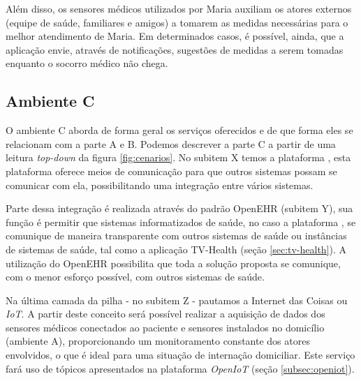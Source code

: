 Além disso, os sensores médicos utilizados por Maria auxiliam os atores
externos (equipe de saúde, familiares e amigos) a tomarem as medidas
necessárias para o melhor atendimento de Maria.  Em determinados casos, é
possível, ainda, que a aplicação envie, através de notificações, sugestões de
medidas a serem tomadas enquanto o socorro médico não chega.

\subsection{Ambiente C} \label{subsec:ambiente-c}

O ambiente C aborda de forma geral os serviços oferecidos e de que forma eles se
relacionam com a parte A e B. Podemos descrever a parte C a partir de uma leitura 
\textit{top-down} da figura \ref{fig:cenarios}. No subitem X temos a plataforma
\nextsaude[], esta plataforma oferece meios de comunicação para que outros sistemas
possam se comunicar com ela, possibilitando uma integração entre vários sistemas.

Parte dessa integração é realizada através do padrão OpenEHR (subitem Y), sua 
função é permitir que sistemas informatizados de saúde, no caso a plataforma
\nextsaude[], se comunique de maneira transparente com outros sistemas de saúde ou
instâncias de sistemas de saúde, tal como a aplicação TV-Health (seção
\vref{sec:tv-health}). A utilização do OpenEHR possibilita que toda a solução
proposta se comunique, com o menor esforço possível, com outros sistemas de 
saúde.

Na última camada da pilha - no subitem Z - pautamos a Internet das Coisas ou
\textit{IoT}. A partir deste conceito será possível realizar a aquisição de
dados dos sensores médicos conectados ao paciente e sensores instalados no domicílio
(ambiente A), proporcionando um monitoramento constante dos atores envolvidos, 
o que é ideal para uma situação de internação domiciliar. Este serviço fará uso 
de tópicos apresentados na plataforma \textit{OpenIoT}
(seção \vref{subsec:openiot}).



